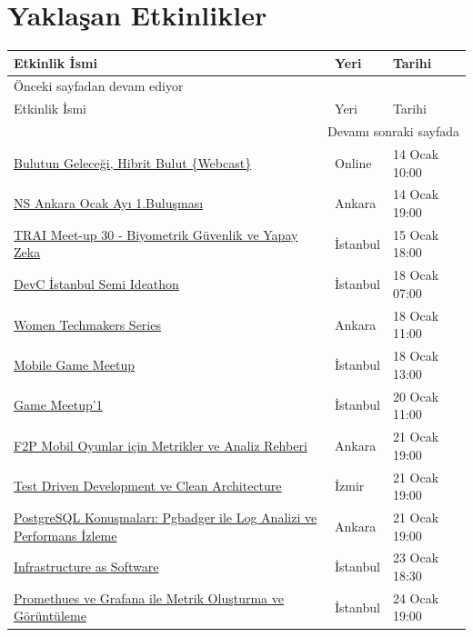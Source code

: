 \documentclass[11pt]{article}
\begin{document}
\section{Yaklaşan Etkinlikler}
\label{sec:org89ff0e4}
\begin{longtable}{|p{8cm}|l|l|}
\hline
Etkinlik İsmi & Yeri & Tarihi\\
\hline
\endfirsthead
\multicolumn{3}{l}{Önceki sayfadan devam ediyor} \\
\hline

Etkinlik İsmi & Yeri & Tarihi \\

\hline
\endhead
\hline\multicolumn{3}{r}{Devamı sonraki sayfada} \\
\endfoot
\endlastfoot
\hline
\href{https://www.meetup.com/Cozumpark/events/267512181/}{Bulutun Geleceği, Hibrit Bulut \{Webcast\}} & Online & 14 Ocak 10:00\\
\href{https://www.meetup.com/NS-Ankara/events/267855245/}{NS Ankara Ocak Ayı 1.Buluşması} & Ankara & 14 Ocak 19:00\\
\href{https://www.eventbrite.com/e/trai-meet-up-30-biyometrik-guvenlik-ve-yapay-zeka-tickets-88912765475}{TRAI Meet-up 30 - Biyometrik Güvenlik ve Yapay Zeka} & İstanbul & 15 Ocak 18:00\\
\href{https://www.eventbrite.com/e/devc-istanbul-semi-ideathon-tickets-88393923605}{DevC İstanbul Semi Ideathon} & İstanbul & 18 Ocak 07:00\\
\href{https://www.meetup.com/GDGAnkara/events/267812348/}{Women Techmakers Series} & Ankara & 18 Ocak 11:00\\
\href{https://www.eventbrite.com/e/mobile-game-meetup-tickets-88795231929}{Mobile Game Meetup} & İstanbul & 18 Ocak 13:00\\
\href{https://www.eventbrite.com/e/game-meetup1-tickets-88215020501}{Game Meetup'1} & İstanbul & 20 Ocak 11:00\\
\href{https://www.meetup.com/Microsoft-Giri\%25C5\%259Fimcilik-Bulu\%25C5\%259Fmalar\%25C4\%25B1/events/267510267/}{F2P Mobil Oyunlar için Metrikler ve Analiz Rehberi} & Ankara & 21 Ocak 19:00\\
\href{https://www.meetup.com/IzmirGophers/events/267488435/}{Test Driven Development ve Clean Architecture} & İzmir & 21 Ocak 19:00\\
\href{https://www.meetup.com/PostgreSQL-TR/events/267534661/}{PostgreSQL Konuşmaları: Pgbadger ile Log Analizi ve Performans İzleme} & Ankara & 21 Ocak 19:00\\
\href{https://kommunity.com/devops-turkiye/events/infrastructure-as-software}{Infrastructure as Software} & İstanbul & 23 Ocak 18:30\\
\href{https://kommunity.com/devnot-yazilimci-bulusmalari/events/promethues-ve-grafana-ile-metrik-olusturma-ve-goruntuleme}{Promethues ve Grafana ile Metrik Oluşturma ve Görüntüleme} & İstanbul & 24 Ocak 19:00\\
\hline
\end{longtable}
\end{document}
